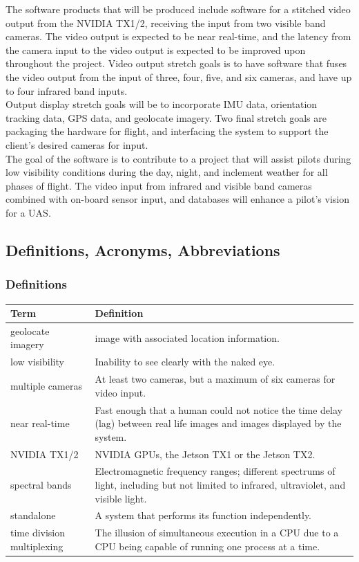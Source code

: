 \documentclass[letterpaper,10pt,serif,draftclsnofoot,onecolumn,compsoc,titlepage]{IEEEtran}
\begin{document}
The software products that will be produced include software for a stitched video output 
from the NVIDIA TX1/2, receiving the input from two visible band cameras. 
The video output is expected to be near real-time, and the latency from the camera 
input to the video output is expected to be improved upon throughout the project. Video 
output stretch goals is to have software that fuses the video output from the input of 
three, four, five, and six cameras, and have up to four infrared band inputs.\\

Output display stretch goals will be to incorporate IMU data, orientation tracking 
data, GPS data, and geolocate imagery. Two final stretch goals are packaging the 
hardware for flight, and interfacing the system to support the client's desired 
cameras for input.\\

The goal of the software is to contribute to a project that will assist pilots during 
low visibility conditions during the day, night, and inclement weather for all phases 
of flight. The video input from infrared and visible band cameras combined with 
on-board sensor input, and databases will enhance a pilot's vision for a UAS.\\

\subsection{Definitions, Acronyms, Abbreviations}

\subsubsection{Definitions}

\begin{tabular}{|l|p{11cm}|}
	\hline
	\textbf{Term} & \textbf{Definition}\\
	\hline
	geolocate imagery & image with associated location information.\\
	\hline
	low visibility & Inability to see clearly with the naked eye.\\
	\hline	
	multiple cameras & At least two cameras, but a maximum of six cameras for 
	video input.\\
	\hline
	near real-time & Fast enough that a human could not notice the time 
	delay (lag) between \newline real life images and images displayed by the system.\\
	\hline
	NVIDIA TX1/2 & NVIDIA GPUs, the Jetson TX1 or the Jetson TX2.\\
	\hline
	spectral bands & Electromagnetic frequency ranges; different 
	spectrums of light, including \newline but not limited to infrared, ultraviolet, 
	and visible light.\\
	\hline
	standalone & A system that performs its function independently. \\
	\hline
	time division multiplexing & The illusion of simultaneous execution in a CPU due
	to a CPU being capable of running one process at a time.\\
	\hline
\end{tabular}
\end{document}
